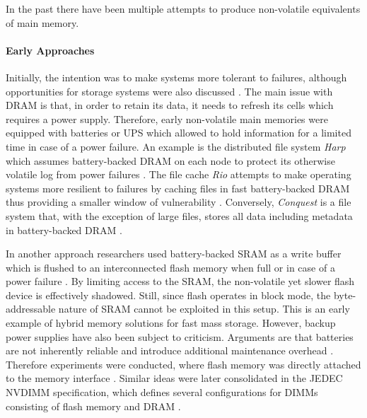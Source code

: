 
In the past there have been multiple attempts to produce non-volatile equivalents of main memory.

\paragraph{Early Approaches}

Initially, the intention was to make systems more tolerant to failures, although
opportunities for storage systems were also discussed \cite{molina1992main,
wang2002conquest}. The main issue with DRAM is that, in order to retain its
data, it needs to refresh its cells which requires a power supply. Therefore,
early non-volatile main memories were equipped with batteries or UPS which
allowed to hold information for a limited time in case of a power failure. An
example is the distributed file system \emph{Harp} which assumes battery-backed
DRAM on each node to protect its otherwise volatile log from power failures
\cite{liskov1991replication}. The file cache \emph{Rio} attempts to make
operating systems more resilient to failures by caching files in fast
battery-backed DRAM thus providing a smaller window of vulnerability
\cite{chen1996rio}. Conversely, \emph{Conquest} is a file system that, with the
exception of large files, stores all data including metadata in battery-backed
DRAM \cite{wang2002conquest}.


In another approach researchers used battery-backed SRAM as a write buffer which
is flushed to an interconnected flash memory when full or in case of a power
failure \cite{wu1994envy}. By limiting access to the SRAM, the non-volatile yet
slower flash device is effectively shadowed. Still, since flash operates in
block mode, the byte-addressable nature of SRAM cannot be exploited in this
setup. This is an early example of hybrid memory solutions for fast mass
storage. However, backup power supplies have also been subject to criticism.
Arguments are that batteries are not inherently reliable and introduce
additional maintenance overhead \cite{molina1992main}. Therefore experiments
were conducted, where flash memory was directly attached to the memory interface
\cite{shi2010write}. Similar ideas were later consolidated in the JEDEC NVDIMM
specification, which defines several configurations for DIMMs consisting of
flash memory and DRAM \cite{oe2016feasibility, huang2014design}.

